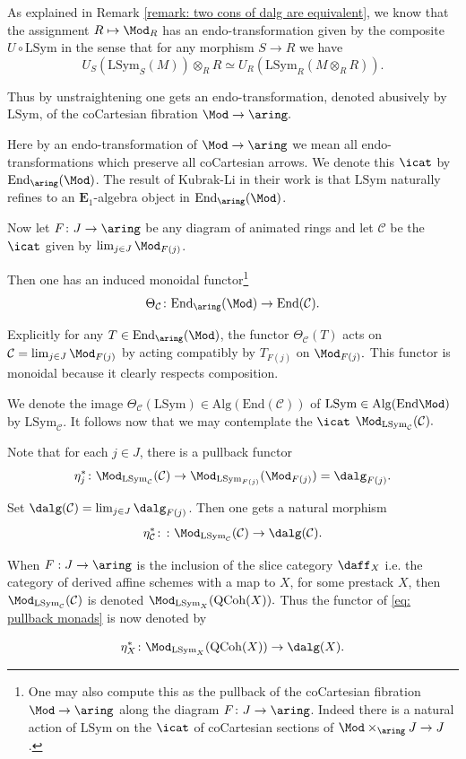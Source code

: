 \documentclass[10pt,reqno]{amsart}
\numberwithin{equation}{section}
\newcommand{\cC}{\mathcal{C}}
\newcommand{\End}{\mathrm{End}}
\newcommand{\Qcoh}{\mathrm{QCoh}}
\newcommand{\Sym}{\mathrm{Sym}}
\newcommand{\Alg}{\mathrm{Alg}}
\renewcommand{\L}{\mathrm{L}}
\begin{document}
\begin{construction}\label{cons: Kubrakli}


As explained in Remark \ref{remark: two cons of dalg are equivalent}, we know that the assignment $R\mapsto \Mod_R$ has an endo-transformation given by the composite $U\circ \L\Sym$ in the sense that for any morphism $S\to R$ we have 
$$
    U_S(\L\Sym_S(M))\otimes_RR\simeq U_R(\L\Sym_R(M\otimes_R R)).
$$

Thus by unstraightening \cite[Theorem 3.2.0.1]{HTT} one gets an endo-transformation, denoted abusively by $\L\Sym$, of the coCartesian fibration $\Mod\to \aring.$ 

Here by an endo-transformation of $\Mod\to \aring$ we mean all endo-transformations which preserve all coCartesian arrows. We denote this $\icat$ by $\End_{\aring}(\Mod)$. The result of Kubrak-Li in their work \cite{KubrakLiKGn_inprep} is that $\L\Sym$ naturally refines to an $\mathbf{E}_1$-algebra object in $\End_{\aring}(\Mod)$. 

Now let $F\colon J\to \aring$ be any diagram of animated rings and let $\cC$ be the $\icat$ given by $\lim_{j\in J}\Mod_{F(j)}$. 

Then one has an induced monoidal functor\footnote{One may also compute this as the pullback of the coCartesian fibration $\Mod\to \aring$ along the diagram $F\colon J\to \aring$. Indeed there is a natural action of $\L\Sym$ on the $\icat$ of coCartesian sections of $\Mod\times_{\aring}J\to J$.}
$$\Theta_{\cC}\colon  \End_{\aring}(\Mod)\to \End(\cC).$$

Explicitly for any $T\in \End_{\aring}(\Mod)$, the functor $\Theta_{\cC}(T)$ acts on $\cC=\lim_{j\in J}\Mod_{F(j)}$ by acting compatibly by $T_{F(j)}$ on $\Mod_{F(j)}.$ This functor is monoidal because it clearly respects composition.

We denote the image $\Theta_{\cC}(\L\Sym)\in \Alg(\End(\cC))$ of $\L\Sym\in \Alg(\End{\Mod})$ by $\L\Sym_{\cC}$.
It follows now that we may contemplate the $\icat$ $\Mod_{\L\Sym_\cC}(\cC).$

Note that for each $j\in J$, there is a pullback functor $$\eta_{j}^*\colon \Mod_{\L\Sym_\cC}(\cC)\to \Mod_{\L\Sym_{F(j)}}(\Mod_{F(j)})=\dalg_{F(j)}.$$

Set $\dalg(\cC)=\lim_{j\in J} \dalg_{F(j)}$. Then one gets a natural morphism
\begin{equation}\label{eq: pullback monads}
    \eta^*_{\cC}\colon \colon \Mod_{\L\Sym_\cC}(\cC)\to \dalg(\cC).
\end{equation}


When $F:J\to \aring$ is the inclusion of the slice category $\daff_X$ i.e. the category of derived affine schemes with a map to $X$, for some prestack $X$, then $\Mod_{\L\Sym_\cC}(\cC)$ is denoted $\Mod_{\L\Sym_X}(\Qcoh(X)).$ Thus the functor of \ref{eq: pullback monads} is now denoted by 

\begin{equation}\label{eq: pullback monads on stacks}
\eta^*_X\colon \Mod_{\L\Sym_X}(\Qcoh(X))\to \dalg(X).
\end{equation}
    
\end{construction}
\end{document}
